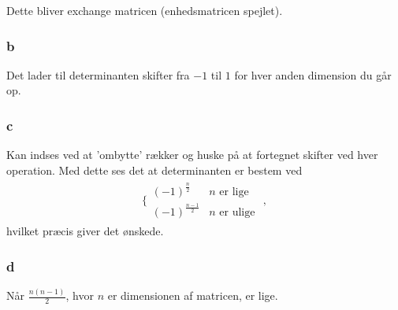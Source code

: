 			Dette bliver exchange matricen (enhedsmatricen spejlet).

			\subsubsection{b}

			Det lader til determinanten skifter fra $-1$ til $1$ for hver anden dimension du går op.

			\subsubsection{c}

			Kan indses ved at 'ombytte' rækker og huske på at fortegnet skifter ved hver operation. Med dette ses det at determinanten er bestem ved
				\begin{align*}
					\bigg\{\begin{array}{ll}{(-1)^{\frac{n}{2}}} & {n \text { er lige }} \\ {(-1)^{\frac{n-1}{2}}} & {n \text { er ulige }}\end{array},
				\end{align*}
			hvilket præcis giver det ønskede.

			\subsubsection{d}

			Når $\frac{n(n-1)}{2}$, hvor $n$ er dimensionen af matricen, er lige.



